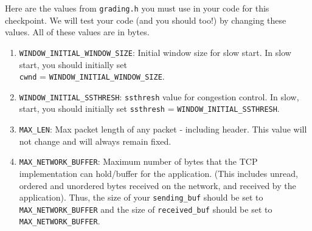 Here are the values from \texttt{grading.h} you must use in your code for this checkpoint. We will test your code (and you should too!) by changing these values. All of these values are in bytes.

\begin{enumerate}
    \item \texttt{WINDOW\_INITIAL\_WINDOW\_SIZE}: Initial window size for slow start. In slow start, you should initially set \\ \texttt{cwnd} = \texttt{WINDOW\_INITIAL\_WINDOW\_SIZE}.
    \item \texttt{WINDOW\_INITIAL\_SSTHRESH}: \texttt{ssthresh} value for congestion control. In slow, start, you should initially set \texttt{ssthresh} = \texttt{WINDOW\_INITIAL\_SSTHRESH}.
    \item \texttt{MAX\_LEN}: Max packet length of any packet - including header. This value will not change and will always remain fixed.
    \item \texttt{MAX\_NETWORK\_BUFFER}: Maximum number of bytes that the TCP implementation can hold/buffer for the application. (This includes unread, ordered and unordered bytes received on the network, and received by the application). Thus, the size of your \texttt{sending\_buf} should be set to \texttt{MAX\_NETWORK\_BUFFER} and the size of  \texttt{received\_buf} should be set to \texttt{MAX\_NETWORK\_BUFFER}.
\end{enumerate}


